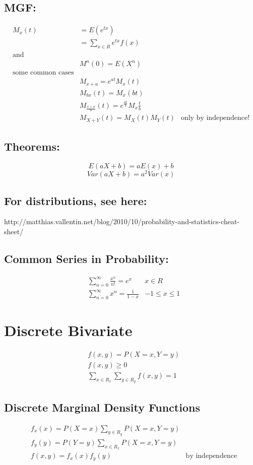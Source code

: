 \documentclass[11pt]{article}
\begin{document}
\subsection*{MGF:}
\begin{align*}
M_x(t) &= E(e^{tx}) \\ 
&= \sum_{x \in R}e^{tx} f(x) \\
\text{and} \\
&M^{n}(0) = E(X^n) \\
\text{some common cases} \\
&M_{x+a} = e^{at}M_x(t)\\
&M_{bx}(t) = M_x(bt) \\
&M_\frac{x+a}{b}(t) = e^{\frac{at}{b}}M_x\frac{t}{b} \\ 
&M_{X+Y}(t) = M_X(t)M_Y(t) & \text{only by independence!} 
\end{align*}

\subsection*{Theorems:}
$$E(aX +b) = aE(x) + b$$
$$Var(aX + b) = a^2Var(x)$$

\subsection*{For distributions, see here:}
http://matthias.vallentin.net/blog/2010/10/probability-and-statistics-cheat-sheet/

\subsection*{Common Series in Probability:}
\begin{align*}
&\sum_{n=0}^{\infty} \frac{x^n}{n!} = e^x  & x \in R \\ 
&\sum_{n=0}^{\infty} x^n = \frac{1}{1-x} & -1 \le x \le 1
\end{align*}

\section{Discrete Bivariate}
\begin{align*}
&f(x,y) = P(X=x,Y=y)\\
&f(x,y) \geq 0\\
&\sum_{x\in R_x}^{} \sum_{y \in R_y}^{} f(x,y) = 1
\end{align*}

\subsection*{Discrete Marginal Density Functions}
\begin{align*}
&f_x(x) = P(X=x) \sum_{y \in R_y}^{} P(X=x, Y=y) \\
&f_y(y) = P(Y=y) \sum_{x \in R_x}^{} P(X=x, Y=y) \\
&f(x,y) = f_x(x)f_y(y) & \text{by independence}
\end{align*}
\end{document}
